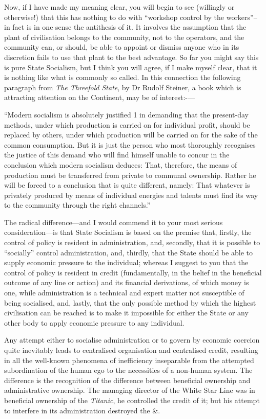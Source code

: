 \documentclass{book}
\begin{document}
Now, if I have made my meaning clear, you will begin to see (willingly or otherwise!) that this has nothing to do with “workshop control by the workers”–in fact is in one sense the antithesis of it. It involves the assumption that the plant of civilisation belongs to the community, not to the operators, and the community can, or should, be able to appoint or dismiss anyone who in its discretion fails to use that plant to the best advantage. So far you might say this is pure State Socialism, but I think you will agree, if I make myself clear, that it is nothing like what is commonly so called. In this connection the following paragraph from \emph{The Threefold State}, by Dr Rudolf Steiner, a book which is attracting attention on the Continent, may be of interest:-—

“Modern socialism is absolutely justified 1 in demanding that the present-day methods, under which production is carried on for individual profit, should be replaced by others, under which production will be carried on for the sake of the common consumption. But it is just the person who most thoroughly recognises the justice of this demand who will find himself unable to concur in the conclusion which modern socialism deduces: That, therefore, the means of production must be transferred from private to communal ownership. Rather he will be forced to a conclusion that is quite different, namely: That whatever is privately produced by means of individual energies and talents must find its way to the community through the right channels.”

The radical difference—and I would commend it to your most serious consideration—is that State Socialism is based on the premise that, firstly, the control of policy is resident in administration, and, secondly, that it is possible to “socially” control administration, and, thirdly, that the State should be able to supply economic pressure to the individual; whereas I suggest to you that the control of policy is resident in credit (fundamentally, in the belief in the beneficial outcome of any line or action) and its financial derivations, of which money is one, while administration is a technical and expert matter not susceptible of being socialised, and, lastly, that the only possible method by which the highest civilisation can be reached is to make it impossible for either the State or any other body to apply economic pressure to any individual.

Any attempt either to socialise administration or to govern by economic coercion quite inevitably leads to centralised organisation and centralised credit, resulting in all the well-known phenomena of inefficiency inseparable from the attempted subordination of the human ego to the necessities of a non-human system. The difference is the recognition of the difference between beneficial ownership and administrative ownership. The managing director of the White Star Line was in beneficial ownership of the \emph{Titanic}, he controlled the credit of it; but his attempt to interfere in its administration destroyed the \&.
\end{document}
